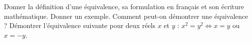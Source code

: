 %
%
	\begin{tasks}
		\task Donner la définition d'une équivalence, sa formulation en français et son écriture mathématique.
		\task Donner un exemple.
		\task Comment peut-on démontrer une équivalence ?
		\task Démontrer l'équivalence suivante pour deux réels $x$ et $y$ : $x^2 = y^2 \Leftrightarrow x=y$ ou $x=-y$.
	\end{tasks}
